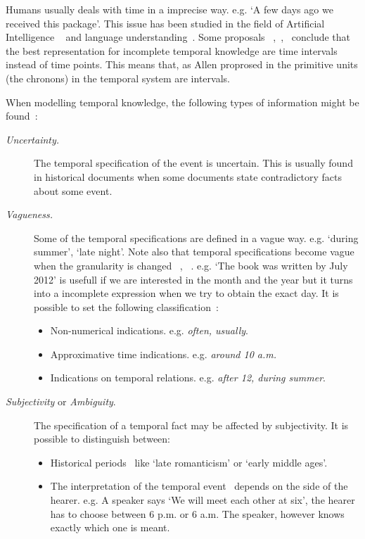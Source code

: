 %
%

Humans usually deals with time in a imprecise way. e.g. `A few days ago we received this package'. This issue has been studied in the field of Artificial Intelligence ~\cite{Tre97} and language understanding~\cite{DeCaluwe:1997:FTI:285506.285516}. Some proposals ~\cite{knight1993},~\cite{Cru97},~\cite{nagypal2003} conclude that the best representation for incomplete temporal knowledge are time intervals instead of time points. This means that, as Allen proprosed in \cite{Allen83} the primitive units (the chronons) in the temporal system are intervals.

When modelling temporal knowledge, the following types of information might be found~\cite{nagypal2003}:

\begin{description}
\item[\emph{Uncertainty.}] The temporal specification of the event is uncertain. This is usually found in historical documents when some documents state contradictory facts about some event.


\item[\emph{Vagueness.}] Some of the temporal specifications are defined in a vague way. e.g. `during summer', `late night'. Note also that temporal specifications become vague when the granularity is changed ~\cite{Cru97},~\cite{nagypal2003} . e.g. `The book was written by July 2012' is usefull if we are interested in the month and the year but it turns into a incomplete expression when we try to obtain the exact day. It is possible to set the following classification~\cite{Dev98}:

\begin{itemize}
\item
Non-numerical indications. e.g. \emph{often, usually}.
\item
Approximative time indications. e.g. \emph{around 10 a.m.}
\item
Indications on temporal relations. e.g. \emph{after 12, during summer}.
\end{itemize}


\item[\emph{Subjectivity} or \emph{Ambiguity}.] The specification of a temporal fact may be affected by subjectivity.  It is possible to distinguish between:
\begin{itemize}
\item Historical periods~\cite{nagypal2003} like `late romanticism' or `early middle ages'. 
\item The interpretation of the temporal event~\cite{Dev98} depends on the side of the hearer. e.g. A speaker says `We will meet each other at six', the hearer has to choose between 6 p.m. or 6 a.m. The speaker, however knows exactly which one is meant. 
\end{itemize}
\end{description}




